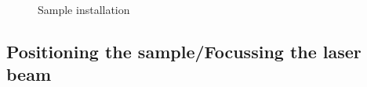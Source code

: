 \documentclass[14pt,a4paper] {article}
\begin{document}
\begin{figure}
\begin{minipage}[h]{0.5\linewidth}
\end{minipage}



\caption{Sample installation}
\label{fig:sampleInstall}
\end{figure}




\subsection{Positioning the sample/Focussing the laser beam}

\end{document}
